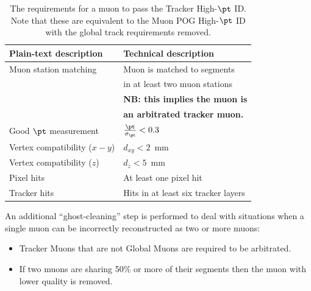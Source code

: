 \begin{table}[h]
    \begin{small}
    \begin{center}
    \begin{tabular}{|l|l|}
      \hline
      Plain-text description         & Technical description                 \\
      \hline
      Muon station matching          & Muon is matched to segments           \\
                                     & in at least two muon stations         \\
                                     & \textbf{NB: this implies the muon is} \\
                                     & \textbf{an arbitrated tracker muon.}  \\
      \hline                                                          
      Good $\pt$ measurement         & $\frac{\pt}{\sigma_{\pt}} < 0.3$      \\
      \hline
      Vertex compatibility ($x-y$)   & $d_{xy} < 2$~mm                       \\
      \hline
      Vertex compatibility ($z$)     & $d_{z} < 5$~mm                        \\
      \hline
      Pixel hits                     & At least one pixel hit                \\
      \hline
      Tracker hits                   & Hits in at least six tracker layers   \\
      \hline
    \end{tabular}
    \caption{
      The requirements for a muon to pass the Tracker High-$\pt$ ID. Note that
      these are equivalent to the Muon POG High-$\pt$ ID with the global track 
      requirements removed.
      }
    \label{tab:highPtID}
    \end{center}
    \end{small}
\end{table}

An additional ``ghost-cleaning'' step is performed to deal with situations when a single muon
can be incorrectly reconstructed as two or more muons:

\begin{itemize}

\item Tracker Muons that are not Global Muons are required to be arbitrated.
\item If two muons are sharing 50\% or more of their segments then the muon with lower quality is removed.

\end{itemize}

